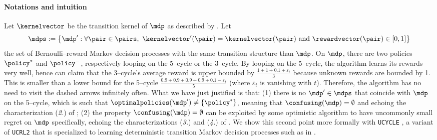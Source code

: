 \documentclass[preprint,cleveref,12pt]{colt2025}
\DeclarePairedDelimiter{\braces}{\{}{\}}	%
\def\model{\mdp}
\def\models{\mdps}
\def\kernel{\kernelvector}
\def\reward{\rewardvector}
\def\optpolicies{\optimalpolicies}
\begin{document}
    \paragraph{Notations and intuition}
    Let $\kernel$ be the transition kernel of $\model$ as described by .
    Let 
    \begin{equation*}
        \models 
        := 
        \braces[\big]{
            \model' 
            : 
            \forall \pair \in \pairs,
            ~
            \kernel'(\pair) = \kernel(\pair) \mathrm{~and~} \reward(\pair) \in [0, 1]
        }
    \end{equation*}
    the set of Bernoulli--reward Markov decision processes with the same transition structure than $\model$. 
    On $\model$, there are two policies $\policy^*$ and $\policy^-$, respectively looping on the 5--cycle or the 3--cycle.
    By looping on the 5--cycle, the algorithm learns its rewards very well, hence can claim that the 3--cycle's average reward is upper bounded by $\frac{1+1+0.1+\varepsilon_t}{3}$ because unknown rewards are bounded by 1. This is smaller than a lower bound for the 5--cycle $\frac{0.9+ 0.9+0.9+0.9+0.1 - \varepsilon_t}{5}$ (where $\varepsilon_t$ is vanishing with $t$).
    Therefore, the algorithm has no need to visit the dashed arrows infinitely often.
    What we have just justified is that: (1) there is no $\model' \in \models$ that coincide with $\model$ on the 5--cycle, which is such that $\optpolicies(\model') \ne \braces{\policy^*}$, meaning that $\confusing(\model) = \emptyset$ and echoing the characterization (\textit{2.}) of ; (2) the property $\confusing(\model) = \emptyset$ can be exploited by some optimistic algorithm to have uncommonly small regret on $\model$ specifically, echoing the characterizations (\textit{3.}) and (\textit{4.}) of . 
    We show this second point more formally with \texttt{UCYCLE} \cite{ortner_online_2010}, a variant of \texttt{UCRL2} that is specialized to learning deterministic transition Markov decision processes such as in .
\end{document}
